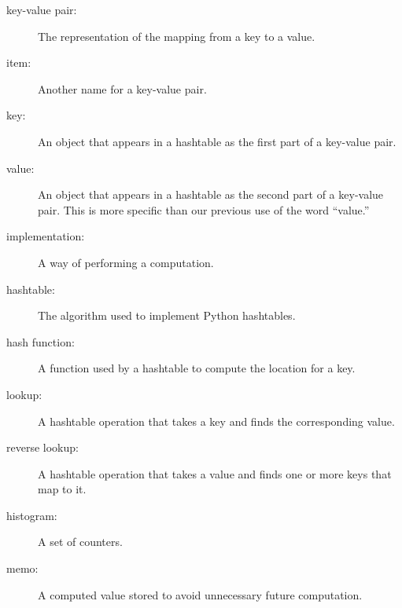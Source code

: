 \documentclass[10pt]{book}
\begin{document}
{\begin{description}
\item[key-value pair:] The representation of the mapping from
a key to a value.

\item[item:] Another name for a key-value pair.

\item[key:] An object that appears in a hashtable as the
first part of a key-value pair.

\item[value:] An object that appears in a hashtable as the
second part of a key-value pair.  This is more specific than
our previous use of the word ``value.''

\item[implementation:] A way of performing a computation.

\item[hashtable:] The algorithm used to implement Python
hashtables.

\item[hash function:] A function used by a hashtable to compute the
location for a key.
% 

\item[lookup:] A hashtable operation that takes a key and finds
the corresponding value.

\item[reverse lookup:] A hashtable operation that takes a value and finds
one or more keys that map to it.
% 
% 

\item[histogram:] A set of counters.

\item[memo:] A computed value stored to avoid unnecessary future 
computation.


\end{description}}
\end{document}
